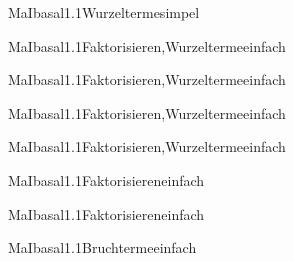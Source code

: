 \documentclass[12pt]{article}
\begin{document}
\begin{Add}{MaI}{basal1.1}{Wurzelterme}{simpel}
\end{Add}

\begin{Add}{MaI}{basal1.1}{Faktorisieren,Wurzelterme}{einfach}
\end{Add}

\begin{Add}{MaI}{basal1.1}{Faktorisieren,Wurzelterme}{einfach}
\end{Add}

\begin{Add}{MaI}{basal1.1}{Faktorisieren,Wurzelterme}{einfach}
\end{Add}
\begin{Add}{MaI}{basal1.1}{Faktorisieren,Wurzelterme}{einfach}
\end{Add}

\begin{Add}{MaI}{basal1.1}{Faktorisieren}{einfach}
\end{Add}

\begin{Add}{MaI}{basal1.1}{Faktorisieren}{einfach}
\end{Add}

\begin{Add}{MaI}{basal1.1}{Bruchterme}{einfach}
\end{Add}
\end{document}
